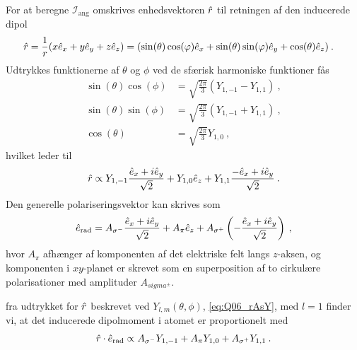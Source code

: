 For at beregne $\mathcal{I}_\text{ang}$ omskrives enhedsvektoren $\Hat{r}$ til retningen af den inducerede dipol
\begin{align}
    \Hat{r} &= \frac{1}{r}(x\Hat{e}_x + y\Hat{e}_y + z\Hat{e}_z) = (\sin(\theta)\cos(\phi)\Hat{e}_x + \sin(\theta)\sin(\phi)\Hat{e}_y + \cos(\theta)\Hat{e}_z) \: .
\end{align}
Udtrykkes funktionerne af $\theta$ og $\phi$ ved de sfærisk harmoniske funktioner fås
\begin{align} \label{eq:Q06_SpericalHarmonicsAsCosAndSine}
    \sin(\theta)\cos(\phi) &= \sqrt{\frac{2\pi}{3}}(Y_{1,-1} - Y_{1,1}) \: , \nonumber\\
    \sin(\theta)\sin(\phi) &= \sqrt{\frac{2\pi}{3}}(Y_{1,-1} + Y_{1,1}) \: , \\
    \cos(\theta) &= \sqrt{\frac{2\pi}{3}}Y_{1,0} \: ,
\end{align}
hvilket leder til
\begin{align} \label{eq:Q06_rAsY}
    \Hat{r} \propto Y_{1,-1} \frac{\Hat{e}_x + i\Hat{e}_y}{\sqrt{2}} + Y_{1,0} \Hat{e}_z + Y_{1,1} \frac{-\Hat{e}_x + i\Hat{e}_y}{\sqrt{2}} \: .
\end{align}
Den generelle polariseringsvektor kan skrives som
\begin{align}
    \Hat{e}_\text{rad} = A_{\sigma^-} \frac{\Hat{e}_x + i\Hat{e}_y}{\sqrt{2}} + A_\pi \Hat{e}_z + A_{\sigma^+} \left(-\frac{\Hat{e}_x + i\Hat{e}_y}{\sqrt{2}}\right) \: ,
\end{align}
hvor $A_\pi$ afhænger af komponenten af det elektriske felt langs $z$-aksen, og komponenten i $xy$-planet er skrevet som en superposition af to cirkulære polarisationer med amplituder $A_{sigma^\pm}$.

fra udtrykket for $\Hat{r}$ beskrevet ved $Y_{l,m}(\theta,\phi)$, \cref{eq:Q06_rAsY}, med $l=1$ finder vi, at det inducerede dipolmoment i atomet er proportionelt med
\begin{align} \label{eq:Q06_HatRPrikERadACoefficienter}
    \Hat{r} \cdot \Hat{e}_\text{rad} \propto A_{\sigma^-} Y_{1,-1} + A_\pi Y_{1,0} + A_{\sigma^+} Y_{1,1} \: .
\end{align}


